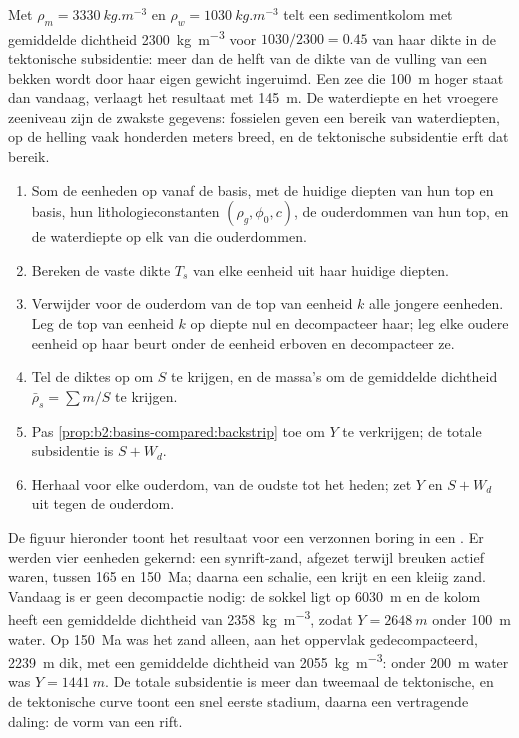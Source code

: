 Met $\rho_m = \qty{3330}{kg.m^{-3}}$ en $\rho_w = \qty{1030}{kg.m^{-3}}$ telt een sedimentkolom met
gemiddelde dichtheid \qty{2300}{kg.m^{-3}} voor $1030/2300 = 0.45$ van haar dikte in de tektonische
subsidentie: meer dan de helft van de dikte van de vulling van een bekken wordt door haar eigen gewicht ingeruimd.
Een zee die \qty{100}{m} hoger staat dan vandaag, verlaagt het resultaat met \qty{145}{m}. De waterdiepte en het
vroegere zeeniveau zijn de zwakste gegevens: fossielen geven een bereik van waterdiepten, op de helling vaak honderden
meters breed, en de tektonische subsidentie erft dat bereik.

\begin{method}\label{met:b2:basins-compared:backstrip}
\begin{enumerate}
  \item Som de eenheden op vanaf de basis, met de huidige diepten van hun top en basis, hun
        lithologieconstanten $(\rho_g, \phi_0, c)$, de ouderdommen van hun top, en de waterdiepte op
        elk van die ouderdommen.
  \item Bereken de vaste dikte $T_s$ van elke eenheid uit haar huidige diepten.
  \item Verwijder voor de ouderdom van de top van eenheid $k$ alle jongere eenheden. Leg de top van eenheid
        $k$ op diepte nul en decompacteer haar; leg elke oudere eenheid op haar beurt onder de eenheid erboven
        en decompacteer ze.
  \item Tel de diktes op om $S$ te krijgen, en de massa's om de gemiddelde dichtheid
        $\bar\rho_s = \sum m / S$ te krijgen.
  \item Pas \cref{prop:b2:basins-compared:backstrip} toe om $Y$ te verkrijgen; de totale subsidentie is
        $S + W_d$.
  \item Herhaal voor elke ouderdom, van de oudste tot het heden; zet $Y$ en $S + W_d$ uit tegen de ouderdom.
\end{enumerate}
\end{method}

De figuur hieronder toont het resultaat voor een verzonnen boring in een . Er werden vier eenheden gekernd:
een synrift-zand, afgezet terwijl breuken actief waren, tussen 165 en \qty{150}{Ma}; daarna een schalie,
een krijt en een kleiig zand. Vandaag is er geen decompactie nodig: de sokkel ligt op \qty{6030}{m}
en de kolom heeft een gemiddelde dichtheid van \qty{2358}{kg.m^{-3}}, zodat $Y = \qty{2648}{m}$ onder
\qty{100}{m} water. Op \qty{150}{Ma} was het zand alleen, aan het oppervlak gedecompacteerd,
\qty{2239}{m} dik, met een gemiddelde dichtheid van \qty{2055}{kg.m^{-3}}: onder \qty{200}{m} water was
$Y = \qty{1441}{m}$. De totale subsidentie is
meer dan tweemaal de tektonische, en de tektonische curve toont een snel eerste stadium, daarna een
vertragende daling: de vorm van een rift.

